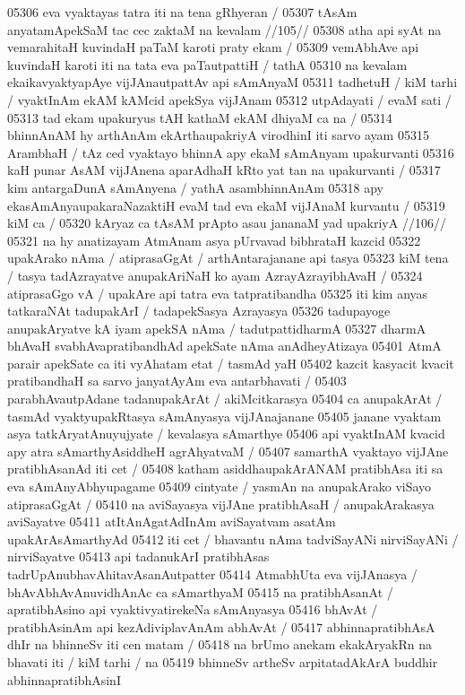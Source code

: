 05306 eva vyaktayas tatra iti na tena gRhyeran /  
05307 	tAsAm anyatamApekSaM tac cec zaktaM na kevalam //105//  
05308 atha api syAt na vemarahitaH kuvindaH paTaM karoti praty ekam /
05309 vemAbhAve api kuvindaH karoti iti na tata eva paTautpattiH / tathA
05310 na kevalam ekaikavyaktyapAye vijJAnautpattAv api sAmAnyaM
05311 tadhetuH / kiM tarhi / vyaktInAm ekAM kAMcid apekSya vijJAnam 
05312 utpAdayati / evaM sati / 
05313 	tad ekam upakuryus tAH kathaM ekAM dhiyaM ca na /
05314 bhinnAnAM hy arthAnAm ekArthaupakriyA virodhinI iti sarvo ayam
05315 ArambhaH / tAz ced vyaktayo bhinnA apy ekaM sAmAnyam upakurvanti  
05316 kaH punar AsAM vijJAnena aparAdhaH kRto yat tan na upakurvanti /
05317 kim antargaDunA sAmAnyena / yathA asambhinnAnAm
05318 apy ekasAmAnyaupakaraNazaktiH evaM tad eva ekaM vijJAnaM kurvantu / 
05319 kiM ca /
05320 	kAryaz ca tAsAM prApto asau jananaM yad upakriyA //106//  
05321 na hy anatizayam AtmAnam asya pUrvavad bibhrataH kazcid 
05322 upakArako nAma / atiprasaGgAt / arthAntarajanane api  tasya
05323 kiM tena / tasya tadAzrayatve anupakAriNaH ko ayam AzrayAzrayibhAvaH /
05324 atiprasaGgo vA / upakAre api tatra eva tatpratibandha
05325 iti kim anyas tatkaraNAt tadupakArI / tadapekSasya Azrayasya 
05326 tadupayoge anupakAryatve kA iyam apekSA nAma / tadutpattidharmA 
05327 dharmA bhAvaH svabhAvapratibandhAd apekSate nAma anAdheyAtizaya
05401 AtmA parair apekSate ca iti vyAhatam etat / tasmAd yaH 
05402 kazcit kasyacit kvacit pratibandhaH sa sarvo janyatAyAm eva antarbhavati /
05403 parabhAvautpAdane tadanupakArAt / akiMcitkarasya  
05404 ca anupakArAt / tasmAd vyaktyupakRtasya sAmAnyasya vijJAnajanane  
05405 janane vyaktam asya tatkAryatAnuyujyate / kevalasya sAmarthye 
05406 api vyaktInAM kvacid apy atra sAmarthyAsiddheH agrAhyatvaM /  
05407 samarthA vyaktayo vijJAne pratibhAsanAd iti cet /
05408 katham asiddhaupakArANAM pratibhAsa iti sa eva sAmAnyAbhyupagame 
05409 cintyate / yasmAn na anupakArako viSayo atiprasaGgAt /  
05410 na aviSayasya vijJAne pratibhAsaH / anupakArakasya aviSayatve 
05411 atItAnAgatAdInAm aviSayatvam asatAm upakArAsAmarthyAd
05412 iti cet / bhavantu nAma tadviSayANi nirviSayANi / nirviSayatve
05413 api tadanukArI pratibhAsas tadrUpAnubhavAhitavAsanAutpatter
05414 AtmabhUta eva vijJAnasya / bhAvAbhAvAnuvidhAnAc ca sAmarthyaM 
05415 na pratibhAsanAt / apratibhAsino api vyaktivyatirekeNa sAmAnyasya
05416 bhAvAt / pratibhAsinAm api kezAdiviplavAnAm abhAvAt /
05417 	abhinnapratibhAsA dhIr na bhinneSv iti cen matam /
05418 na brUmo anekam ekakAryakRn na bhavati iti / kiM tarhi / na  
05419 bhinneSv artheSv arpitatadAkArA buddhir abhinnapratibhAsinI 
